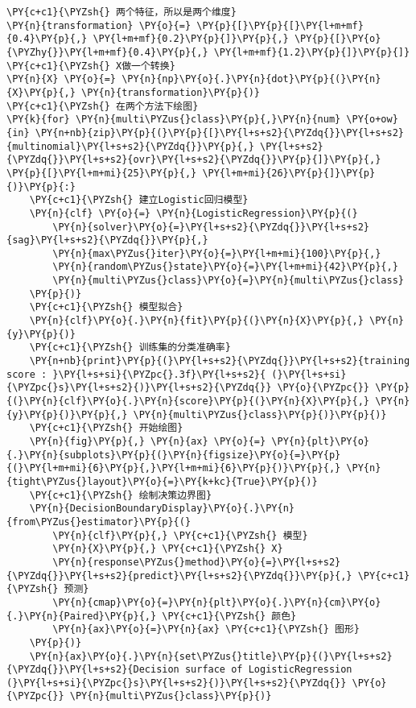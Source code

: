 \begin{Verbatim}[commandchars=\\\{\}]
\PY{c+c1}{\PYZsh{} 两个特征，所以是两个维度}
\PY{n}{transformation} \PY{o}{=} \PY{p}{[}\PY{p}{[}\PY{l+m+mf}{0.4}\PY{p}{,} \PY{l+m+mf}{0.2}\PY{p}{]}\PY{p}{,} \PY{p}{[}\PY{o}{\PYZhy{}}\PY{l+m+mf}{0.4}\PY{p}{,} \PY{l+m+mf}{1.2}\PY{p}{]}\PY{p}{]}
\PY{c+c1}{\PYZsh{} X做一个转换}
\PY{n}{X} \PY{o}{=} \PY{n}{np}\PY{o}{.}\PY{n}{dot}\PY{p}{(}\PY{n}{X}\PY{p}{,} \PY{n}{transformation}\PY{p}{)}
\PY{c+c1}{\PYZsh{} 在两个方法下绘图}
\PY{k}{for} \PY{n}{multi\PYZus{}class}\PY{p}{,}\PY{n}{num} \PY{o+ow}{in} \PY{n+nb}{zip}\PY{p}{(}\PY{p}{[}\PY{l+s+s2}{\PYZdq{}}\PY{l+s+s2}{multinomial}\PY{l+s+s2}{\PYZdq{}}\PY{p}{,} \PY{l+s+s2}{\PYZdq{}}\PY{l+s+s2}{ovr}\PY{l+s+s2}{\PYZdq{}}\PY{p}{]}\PY{p}{,} \PY{p}{[}\PY{l+m+mi}{25}\PY{p}{,} \PY{l+m+mi}{26}\PY{p}{]}\PY{p}{)}\PY{p}{:}
    \PY{c+c1}{\PYZsh{} 建立Logistic回归模型}
    \PY{n}{clf} \PY{o}{=} \PY{n}{LogisticRegression}\PY{p}{(}
        \PY{n}{solver}\PY{o}{=}\PY{l+s+s2}{\PYZdq{}}\PY{l+s+s2}{sag}\PY{l+s+s2}{\PYZdq{}}\PY{p}{,} 
        \PY{n}{max\PYZus{}iter}\PY{o}{=}\PY{l+m+mi}{100}\PY{p}{,} 
        \PY{n}{random\PYZus{}state}\PY{o}{=}\PY{l+m+mi}{42}\PY{p}{,} 
        \PY{n}{multi\PYZus{}class}\PY{o}{=}\PY{n}{multi\PYZus{}class}
    \PY{p}{)}
    \PY{c+c1}{\PYZsh{} 模型拟合}
    \PY{n}{clf}\PY{o}{.}\PY{n}{fit}\PY{p}{(}\PY{n}{X}\PY{p}{,} \PY{n}{y}\PY{p}{)}
    \PY{c+c1}{\PYZsh{} 训练集的分类准确率}
    \PY{n+nb}{print}\PY{p}{(}\PY{l+s+s2}{\PYZdq{}}\PY{l+s+s2}{training score : }\PY{l+s+si}{\PYZpc{}.3f}\PY{l+s+s2}{ (}\PY{l+s+si}{\PYZpc{}s}\PY{l+s+s2}{)}\PY{l+s+s2}{\PYZdq{}} \PY{o}{\PYZpc{}} \PY{p}{(}\PY{n}{clf}\PY{o}{.}\PY{n}{score}\PY{p}{(}\PY{n}{X}\PY{p}{,} \PY{n}{y}\PY{p}{)}\PY{p}{,} \PY{n}{multi\PYZus{}class}\PY{p}{)}\PY{p}{)}
    \PY{c+c1}{\PYZsh{} 开始绘图}
    \PY{n}{fig}\PY{p}{,} \PY{n}{ax} \PY{o}{=} \PY{n}{plt}\PY{o}{.}\PY{n}{subplots}\PY{p}{(}\PY{n}{figsize}\PY{o}{=}\PY{p}{(}\PY{l+m+mi}{6}\PY{p}{,}\PY{l+m+mi}{6}\PY{p}{)}\PY{p}{,} \PY{n}{tight\PYZus{}layout}\PY{o}{=}\PY{k+kc}{True}\PY{p}{)}
    \PY{c+c1}{\PYZsh{} 绘制决策边界图}
    \PY{n}{DecisionBoundaryDisplay}\PY{o}{.}\PY{n}{from\PYZus{}estimator}\PY{p}{(}
        \PY{n}{clf}\PY{p}{,} \PY{c+c1}{\PYZsh{} 模型}
        \PY{n}{X}\PY{p}{,} \PY{c+c1}{\PYZsh{} X}
        \PY{n}{response\PYZus{}method}\PY{o}{=}\PY{l+s+s2}{\PYZdq{}}\PY{l+s+s2}{predict}\PY{l+s+s2}{\PYZdq{}}\PY{p}{,} \PY{c+c1}{\PYZsh{} 预测}
        \PY{n}{cmap}\PY{o}{=}\PY{n}{plt}\PY{o}{.}\PY{n}{cm}\PY{o}{.}\PY{n}{Paired}\PY{p}{,} \PY{c+c1}{\PYZsh{} 颜色}
        \PY{n}{ax}\PY{o}{=}\PY{n}{ax} \PY{c+c1}{\PYZsh{} 图形}
    \PY{p}{)}
    \PY{n}{ax}\PY{o}{.}\PY{n}{set\PYZus{}title}\PY{p}{(}\PY{l+s+s2}{\PYZdq{}}\PY{l+s+s2}{Decision surface of LogisticRegression (}\PY{l+s+si}{\PYZpc{}s}\PY{l+s+s2}{)}\PY{l+s+s2}{\PYZdq{}} \PY{o}{\PYZpc{}} \PY{n}{multi\PYZus{}class}\PY{p}{)}

\end{Verbatim}
